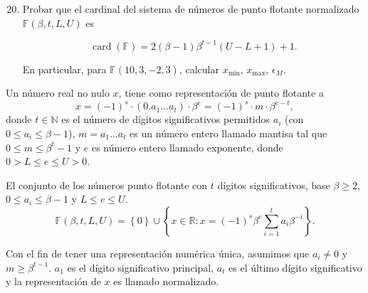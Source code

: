 \documentclass[
	spanish,
	8pt,
	utf8,
	xcolor=table,
	handout,
	aspectratio=169,
	professionalfonts,
	mathserif,
	leqno,
]{beamer}
\begin{document}
\begin{frame}
	\begin{enumerate}\setcounter{enumi}{19}
		\item

		      Probar que el cardinal del sistema de números de punto
		      flotante normalizado
		      $\mathbb{F}\left(\beta, t, L, U\right)$ es

		      \begin{equation*}
			      \operatorname{card}\left(\mathbb{F}\right)=
			      2\left(\beta-1\right)\beta^{t-1}\left(U-L+1\right)+1.
		      \end{equation*}

		      En particular, para $\mathbb{F}\left(10,3,-2,3\right)$,
		      calcular $x_{\min}$, $x_{\max}$, $\epsilon_{M}$.

	\end{enumerate}
\end{frame}

\begin{frame}
	\begin{definition}
		Un número real no nulo $x$, tiene como
		\alert{representación de punto flotante} a
		\begin{equation*}
			x=
			{\left(-1\right)}^{s}\cdot
			\left(0.a_{1}\ldots a_{t}\right)\cdot
			{\beta}^{e}=
			{\left(-1\right)}^{s}\cdot
			m\cdot{\beta}^{e-t},
		\end{equation*}
		donde $t\in\mathbb{N}$ es el número de dígitos significativos
		permitidos $a_{i}$ (con $0\leq a_{i}\leq\beta-1$),
		$m=a_{1}\ldots a_{t}$ es un número entero llamado mantisa tal
		que $0\leq m\leq{\beta}^{t}-1$ y $e$ es número entero
		llamado exponente, donde $0>L\leq e\leq U>0$.
	\end{definition}

	\begin{definition}
		El conjunto de los números punto flotante con $t$ dígitos
		significativos, base $\beta\geq2$, $0\leq a_{i}\leq\beta-1$ y
		$L\leq e\leq U$.
		\begin{equation*}
			\mathbb{F}\left(\beta, t, L, U\right)=
			\left\{0\right\}\cup
			\left\{
			x\in\mathbb{R}:x=
			{\left(-1\right)}^{s}
			\beta^{e}
			\sum_{i=1}^{t}a_{i}\beta^{-i}
			\right\}.
		\end{equation*}
	\end{definition}
	Con el fin de tener una representación numérica única, asumimos
	que $a_{i}\neq0$ y $m\geq{\beta}^{t-1}$.
	$a_{1}$ es el dígito significativo principal, $a_{t}$ es el
	último dígito significativo y la
	representación de $x$ es llamado \alert{normalizado}.
\end{frame}
\end{document}
